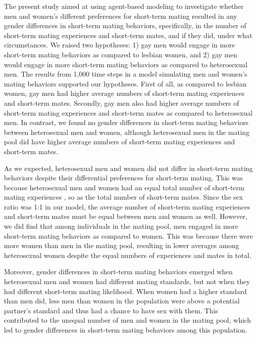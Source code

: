 \documentclass[
  11pt,
]{article}
\begin{document}
The present study aimed at using agent-based modeling to investigate
whether men and women's different preferences for short-term mating
resulted in any gender differences in short-term mating behaviors,
specifically, in the number of short-term mating experiences and
short-term mates, and if they did, under what circumstances. We raised
two hypotheses: 1) gay men would engage in more short-term mating
behaviors as compared to lesbian women, and 2) gay men would engage in
more short-term mating behaviors as compared to heterosexual men. The
results from 1,000 time steps in a model simulating men and women's
mating behaviors supported our hypotheses. First of all, as compared to
lesbian women, gay men had higher average numbers of short-term mating
experiences and short-term mates. Secondly, gay men also had higher
average numbers of short-term mating experiences and short-term mates as
compared to heterosexual men. In contrast, we found no gender
differences in short-term mating behaviors between heterosexual men and
women, although heterosexual men in the mating pool did have higher
average numbers of short-term mating experiences and short-term mates.

As we expected, heterosexual men and women did not differ in short-term
mating behaviors despite their differential preferences for short-term
mating. This was because heterosexual men and women had an equal total
number of short-term mating experiences , so as the total number of
short-term mates. Since the sex ratio was 1:1 in our model, the average
number of short-term mating experiences and short-term mates must be
equal between men and women as well. However, we did find that among
individuals in the mating pool, men engaged in more short-term mating
behaviors as compared to women. This was because there were more women
than men in the mating pool, resulting in lower averages among
heterosexual women despite the equal numbers of experiences and mates in
total.

Moreover, gender differences in short-term mating behaviors emerged when
heterosexual men and women had different mating standards, but not when
they had different short-term mating likelihood. When women had a higher
standard than men did, less men than women in the population were above
a potential partner's standard and thus had a chance to have sex with
them. This contributed to the unequal number of men and women in the
mating pool, which led to gender differences in short-term mating
behaviors among this population.
\end{document}
